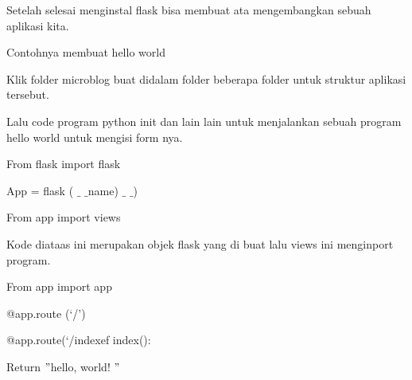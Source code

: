 {{{{\noindent 
{\fontsize{14pt}{14pt}\selectfont Setelah selesai menginstal flask bisa membuat ata mengembangkan sebuah aplikasi kita.  \\} \par
\noindent 
{\fontsize{14pt}{14pt}\selectfont Contohnya membuat hello world \\} \par
\noindent 
{\fontsize{14pt}{14pt}\selectfont Klik folder microblog buat didalam folder beberapa folder untuk struktur aplikasi tersebut. \\} \par
\vspace{14pt}
\noindent 
{\fontsize{14pt}{14pt}\selectfont Lalu code program python init dan lain lain untuk menjalankan sebuah program hello world untuk mengisi form nya. \\} \par
\noindent 
{\fontsize{14pt}{14pt}\selectfont From flask import flask \\} \par
\vspace{14pt}
\noindent 
{\fontsize{14pt}{14pt}\selectfont App = flask ( $  \_  $ $  \_  $name) $  \_  $ $  \_  $) \\} \par
\vspace{14pt}
\noindent 
{\fontsize{14pt}{14pt}\selectfont From app import views \\} \par
\vspace{14pt}
\noindent 
{\fontsize{14pt}{14pt}\selectfont Kode diataas ini merupakan objek flask yang di buat lalu views ini menginport program. \\} \par
\vspace{14pt}
\noindent 
{\fontsize{14pt}{14pt}\selectfont From app import app \\} \par
\vspace{14pt}
\noindent 
{\fontsize{14pt}{14pt}\selectfont @app.route (‘/’) \\} \par
\vspace{14pt}
\noindent 
{\fontsize{14pt}{14pt}\selectfont @app.route(‘/indexef index(): \\} \par
\vspace{14pt}
\noindent 
{\fontsize{14pt}{14pt}\selectfont Return  $ " $hello, world! $ " $ \\} \par
}}}}
